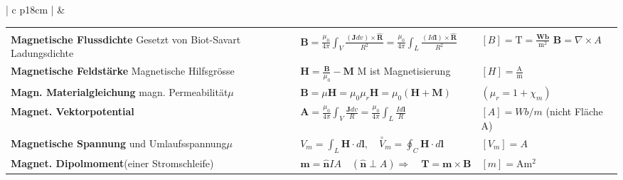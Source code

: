 	\begin{tabular}{ | c   p{18cm} |}
		\hline
		\rotcell{\large\textbf{\textcolor{white}{Magnetostatik}}}  &
		\setlength{\extrarowheight}{10pt}	
		
		\begin{tabular}{L{5cm} L{6.5cm} L{5.3cm}}
			&&\\[-20pt]
			
			
			\textbf{Magnetische Flussdichte} \qquad\qquad\qquad Gesetzt von Biot-Savart Ladungsdichte&$\displaystyle \mathbf{B}=\frac{\mu_{0}}{4 \pi} \int_{V} \frac{(\mathbf{J} d v) \times \hat{\mathbf{R}}}{R^{2}}=\frac{\mu_{0}}{4 \pi} \int_{L} \frac{(I d \mathbf{l}) \times \hat{\mathbf{R}}}{R^{2}} $&$\displaystyle [B]=\mathrm{T}=\frac{\mathbf{W b}}{\mathrm{m}^{2}}$ \quad $\displaystyle \mathbf{B}= \nabla \times A$\\[5pt]
			
			
			\textbf{Magnetische Feldstärke} \qquad\qquad Magnetische Hilfsgrösse&$\displaystyle \mathbf{H}=\frac{\mathbf{B}}{\mu_{0}}-\mathbf{M} $ \quad M ist Magnetisierung&$\displaystyle \left[H\right]=\frac{\mathrm{A}}{\mathrm{m}}$\\[5pt]
	
			\textbf{Magn. Materialgleichung} \qquad\qquad\qquad magn. Permeabilität$\mu$&
			$\displaystyle \mathbf{B}=\mu \mathbf{H}=\mu_{0} \mu_{r} \mathbf{H}=\mu_{0}(\mathbf{H}+\mathbf{M}) $&$\displaystyle \left(\mu_{r}=1+\chi_{m}\right)$\\[5pt]
			
			\textbf{ Magnet. Vektorpotential} &$\displaystyle \mathbf{A}=\frac{\mu_{0}}{4 \pi} \int_{V} \frac{\mathbf{J} d v}{R}=\frac{\mu_{0}}{4 \pi} \int_{L} \frac{I d \mathbf{l}}{R}$&$\left[ A\right ]= Wb/m$ (nicht Fläche A)\\[5pt]
			
			\textbf{Magnetische Spannung} \qquad\qquad\qquad und Umlaufsspannung$\mu$&
			$\displaystyle V_{m}=\int_{L} \mathbf{H} \cdot d \mathbf{l}, \quad \stackrel{\circ}{V}_{m}=\oint_{C} \mathbf{H} \cdot d \mathbf{l}$
			& $\displaystyle \left[V_m\right]=A$\\[5pt]
			
			
			\textbf{Magnet. Dipolmoment}\qquad\qquad (einer Stromschleife) &$\displaystyle \mathbf{m}=\hat{\mathbf{n}} I A \quad(\hat{\mathbf{n}} \perp A)  \Rightarrow \quad \mathbf{T}=\mathbf{m} \times \mathbf{B} $&$[m]=\mathrm{A} \mathrm{m}^{2}$\\[5pt]
			

\end{tabular}
\end{tabular}
